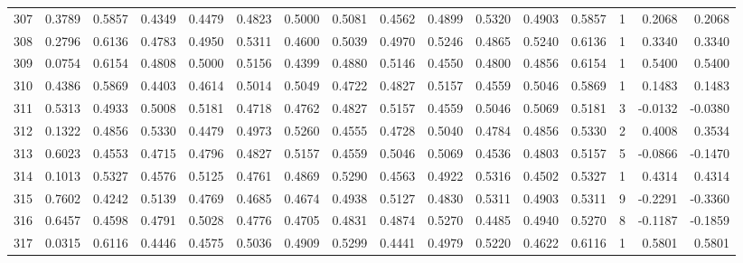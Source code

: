 \begin{tabular}{lrrrrrrrrrrrrrrr}
307 &      0.3789 &  0.5857 &  0.4349 &  0.4479 &  0.4823 &  0.5000 &  0.5081 &  0.4562 &  0.4899 &  0.5320 &   0.4903 &     0.5857 &      1 &                    0.2068 &                     0.2068 \\
308 &      0.2796 &  0.6136 &  0.4783 &  0.4950 &  0.5311 &  0.4600 &  0.5039 &  0.4970 &  0.5246 &  0.4865 &   0.5240 &     0.6136 &      1 &                    0.3340 &                     0.3340 \\
309 &      0.0754 &  0.6154 &  0.4808 &  0.5000 &  0.5156 &  0.4399 &  0.4880 &  0.5146 &  0.4550 &  0.4800 &   0.4856 &     0.6154 &      1 &                    0.5400 &                     0.5400 \\
310 &      0.4386 &  0.5869 &  0.4403 &  0.4614 &  0.5014 &  0.5049 &  0.4722 &  0.4827 &  0.5157 &  0.4559 &   0.5046 &     0.5869 &      1 &                    0.1483 &                     0.1483 \\
311 &      0.5313 &  0.4933 &  0.5008 &  0.5181 &  0.4718 &  0.4762 &  0.4827 &  0.5157 &  0.4559 &  0.5046 &   0.5069 &     0.5181 &      3 &                   -0.0132 &                    -0.0380 \\
312 &      0.1322 &  0.4856 &  0.5330 &  0.4479 &  0.4973 &  0.5260 &  0.4555 &  0.4728 &  0.5040 &  0.4784 &   0.4856 &     0.5330 &      2 &                    0.4008 &                     0.3534 \\
313 &      0.6023 &  0.4553 &  0.4715 &  0.4796 &  0.4827 &  0.5157 &  0.4559 &  0.5046 &  0.5069 &  0.4536 &   0.4803 &     0.5157 &      5 &                   -0.0866 &                    -0.1470 \\
314 &      0.1013 &  0.5327 &  0.4576 &  0.5125 &  0.4761 &  0.4869 &  0.5290 &  0.4563 &  0.4922 &  0.5316 &   0.4502 &     0.5327 &      1 &                    0.4314 &                     0.4314 \\
315 &      0.7602 &  0.4242 &  0.5139 &  0.4769 &  0.4685 &  0.4674 &  0.4938 &  0.5127 &  0.4830 &  0.5311 &   0.4903 &     0.5311 &      9 &                   -0.2291 &                    -0.3360 \\
316 &      0.6457 &  0.4598 &  0.4791 &  0.5028 &  0.4776 &  0.4705 &  0.4831 &  0.4874 &  0.5270 &  0.4485 &   0.4940 &     0.5270 &      8 &                   -0.1187 &                    -0.1859 \\
317 &      0.0315 &  0.6116 &  0.4446 &  0.4575 &  0.5036 &  0.4909 &  0.5299 &  0.4441 &  0.4979 &  0.5220 &   0.4622 &     0.6116 &      1 &                    0.5801 &                     0.5801 \\

\end{tabular}
